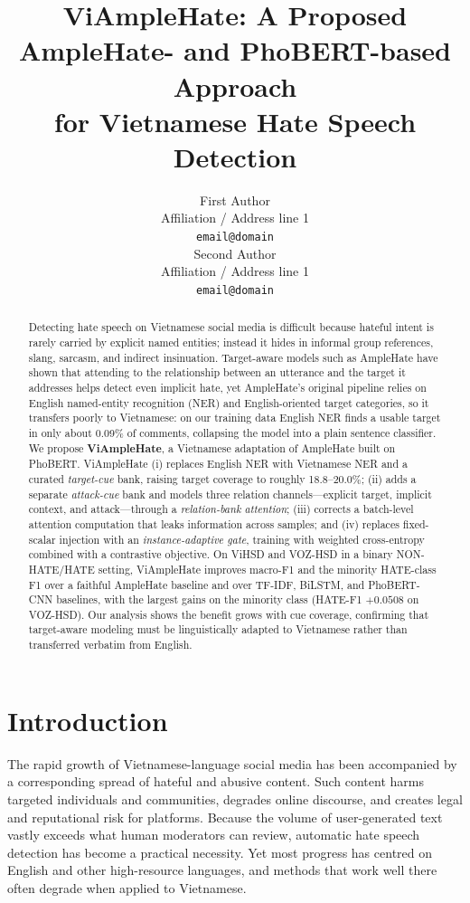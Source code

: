 \documentclass[11pt]{article}
\title{ViAmpleHate: A Proposed AmpleHate- and PhoBERT-based Approach\\ for Vietnamese Hate Speech Detection}
\author{First Author \\
  Affiliation / Address line 1 \\
  \texttt{email@domain} \\\And
  Second Author \\
  Affiliation / Address line 1 \\
  \texttt{email@domain} \\}
\begin{document}
\maketitle

\begin{abstract}
Detecting hate speech on Vietnamese social media is difficult because hateful intent is rarely carried by explicit named entities; instead it hides in informal group references, slang, sarcasm, and indirect insinuation. Target-aware models such as AmpleHate have shown that attending to the relationship between an utterance and the target it addresses helps detect even implicit hate, yet AmpleHate's original pipeline relies on English named-entity recognition (NER) and English-oriented target categories, so it transfers poorly to Vietnamese: on our training data English NER finds a usable target in only about 0.09\% of comments, collapsing the model into a plain sentence classifier. We propose \textbf{ViAmpleHate}, a Vietnamese adaptation of AmpleHate built on PhoBERT. ViAmpleHate (i) replaces English NER with Vietnamese NER and a curated \emph{target-cue} bank, raising target coverage to roughly 18.8--20.0\%; (ii) adds a separate \emph{attack-cue} bank and models three relation channels---explicit target, implicit context, and attack---through a \emph{relation-bank attention}; (iii) corrects a batch-level attention computation that leaks information across samples; and (iv) replaces fixed-scalar injection with an \emph{instance-adaptive gate}, training with weighted cross-entropy combined with a contrastive objective. On ViHSD and VOZ-HSD in a binary NON-HATE/HATE setting, ViAmpleHate improves macro-F1 and the minority HATE-class F1 over a faithful AmpleHate baseline and over TF-IDF, BiLSTM, and PhoBERT-CNN baselines, with the largest gains on the minority class (HATE-F1 $+0.0508$ on VOZ-HSD). Our analysis shows the benefit grows with cue coverage, confirming that target-aware modeling must be linguistically adapted to Vietnamese rather than transferred verbatim from English.
\end{abstract}

\section{Introduction}

The rapid growth of Vietnamese-language social media has been accompanied by a corresponding spread of hateful and abusive content. Such content harms targeted individuals and communities, degrades online discourse, and creates legal and reputational risk for platforms. Because the volume of user-generated text vastly exceeds what human moderators can review, automatic hate speech detection has become a practical necessity. Yet most progress has centred on English and other high-resource languages, and methods that work well there often degrade when applied to Vietnamese.
\end{document}
